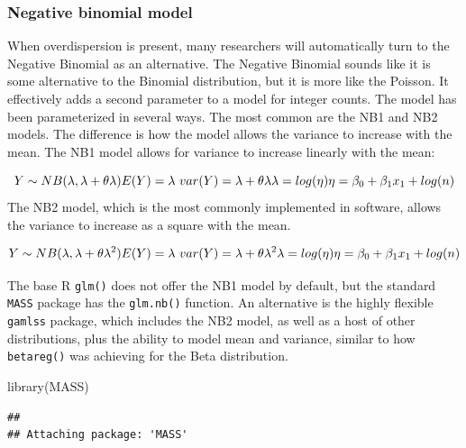 \documentclass[
]{article}
\newenvironment{Shaded}{\begin{snugshade}}{\end{snugshade}}
\newcommand{\FunctionTok}[1]{\textcolor[rgb]{0.00,0.00,0.00}{#1}}
\newcommand{\NormalTok}[1]{#1}
\begin{document}
\hypertarget{negative-binomial-model}{%
\subsubsection{Negative binomial model}\label{negative-binomial-model}}

When overdispersion is present, many researchers will automatically turn to the Negative Binomial as an alternative. The Negative Binomial sounds like it is some alternative to the Binomial distribution, but it is more like the Poisson. It effectively adds a second parameter to a model for integer counts. The model has been parameterized in several ways. The most common are the NB1 and NB2 models. The difference is how the model allows the variance to increase with the mean. The NB1 model allows for variance to increase linearly with the mean:

\[
Y \sim NB (\lambda, \lambda+ \theta \lambda) \\
E(Y) = \lambda \\
\text{   } var(Y) = \lambda+\theta\lambda \\
\lambda = log(\eta) \\ 
\eta = \beta_0 + \beta_1 x_1+ log(n)
\]
The NB2 model, which is the most commonly implemented in software, allows the variance to increase as a square with the mean.

\[
Y \sim NB (\lambda, \lambda+ \theta \lambda^2) \\
E(Y) = \lambda \\
\text{   } var(Y) = \lambda+ \theta \lambda^2 \\
\lambda = log(\eta) \\ 
\eta = \beta_0 + \beta_1 x_1+ log(n)
\]

The base R \texttt{glm()} does not offer the NB1 model by default, but the standard \texttt{MASS} package \citep{venables_ripley} has the \texttt{glm.nb()} function. An alternative is the highly flexible \texttt{gamlss} package\citep{gamlss}, which includes the NB2 model, as well as a host of other distributions, plus the ability to model mean and variance, similar to how \texttt{betareg()} was achieving for the Beta distribution.

\begin{Shaded}
\begin{Highlighting}[]
\FunctionTok{library}\NormalTok{(MASS)}
\end{Highlighting}
\end{Shaded}

\begin{verbatim}
## 
## Attaching package: 'MASS'
\end{verbatim}
\end{document}
